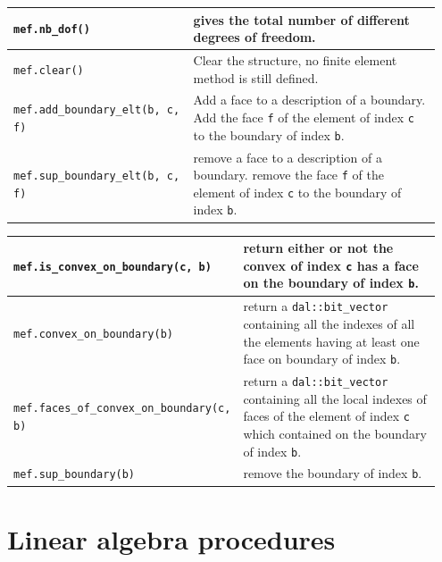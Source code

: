 \documentclass[11pt,a4paper]{article}
\begin{document}
\begin{center}
\begin{tabular}{|m{0.4\linewidth}|m{0.55\linewidth}|}
  {\tt mef.nb\_dof()} & gives the total number of different degrees of freedom.  \\ \hline

  {\tt mef.clear()} & Clear the structure, no finite element method is still defined.  \\ \hline

  {\tt mef.add\_boundary\_elt(b, c, f)} & Add a face to a description of a boundary. Add the face {\tt f} of the element of index {\tt c} to the boundary of index {\tt b}.  \\ \hline
  
  {\tt mef.sup\_boundary\_elt(b, c, f)} & remove a face to a description of a boundary. remove the face {\tt f} of the element of index {\tt c} to the boundary of index {\tt b}.  \\ \hline
\end{tabular} \end{center}

\begin{center} \begin{tabular}{|m{0.4\linewidth}|m{0.55\linewidth}|} \hline
  
  {\tt mef.is\_convex\_on\_boundary(c, b)} & return either or not the convex of index {\tt c}  has a face on the boundary of index {\tt b}.  \\ \hline
  
  {\tt mef.convex\_on\_boundary(b)} & return a {\tt dal::bit\_vector} containing all the indexes of all the elements having at least one face on boundary of index {\tt b}.  \\ \hline

  {\tt mef.faces\_of\_convex\_on\_boundary(c, b) } & return a {\tt dal::bit\_vector} containing all the local indexes of faces of the element of index {\tt c} which contained on the boundary of index {\tt b}.  \\ \hline

  {\tt mef.sup\_boundary(b) } & remove the boundary of index {\tt b}.  \\ \hline

\end{tabular} \end{center}

\section{Linear algebra procedures}
\end{document}
